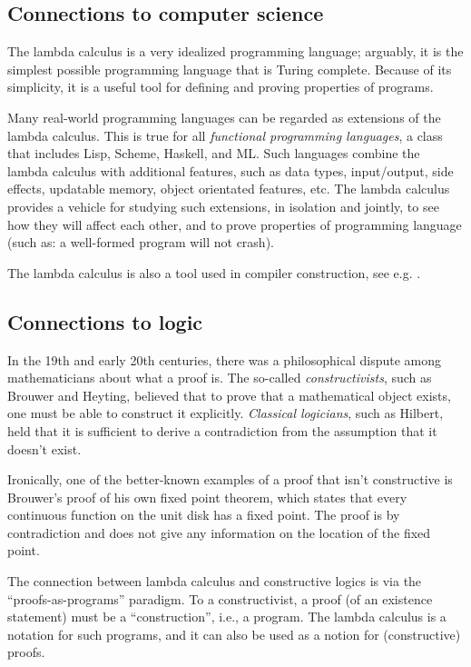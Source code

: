 \documentclass{article}
\begin{document}
\subsection{Connections to computer science}

The lambda calculus is a very idealized programming language;
arguably, it is the simplest possible programming language that is
Turing complete. Because of its simplicity, it is a useful tool for
defining and proving properties of programs.

Many real-world programming languages can be regarded as extensions of
the lambda calculus. This is true for all {\em functional programming
  languages}, a class that includes Lisp, Scheme, Haskell, and ML.
Such languages combine the lambda calculus with additional features,
such as data types, input/output, side effects, updatable memory,
object orientated features, etc. The lambda calculus provides a
vehicle for studying such extensions, in isolation and jointly, to see
how they will affect each other, and to prove properties of
programming language (such as: a well-formed program will not crash).

The lambda calculus is also a tool used in compiler construction, see
e.g. \cite{Pey87,App92}.

\subsection{Connections to logic}

In the 19th and early 20th centuries, there was a philosophical
dispute among mathematicians about what a proof is. The so-called {\em
  constructivists}, such as Brouwer and Heyting, believed that to prove
that a mathematical object exists, one must be able to construct it
explicitly. {\em Classical logicians}, such as Hilbert, held that it
is sufficient to derive a contradiction from the assumption that it
doesn't exist.

Ironically, one of the better-known examples of a proof that isn't
constructive is Brouwer's proof of his own fixed point theorem,
which states that every continuous function on the unit disk has a
fixed point. The proof is by contradiction and does not give any
information on the location of the fixed point.

The connection between lambda calculus and constructive logics is via
the ``proofs-as-programs'' paradigm. To a constructivist, a proof (of
an existence statement) must be a ``construction'', i.e., a program.
The lambda calculus is a notation for such programs, and it can also
be used as a notion for (constructive) proofs.
\end{document}
